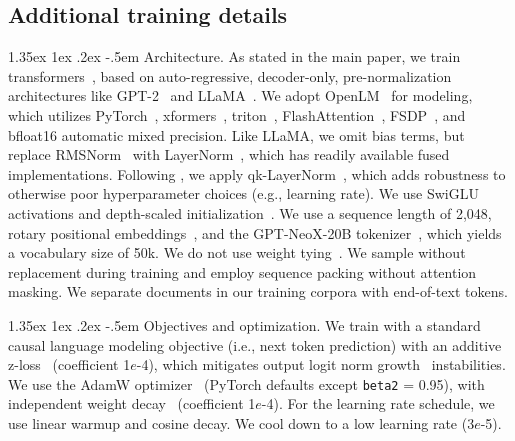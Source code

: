 \documentclass[dvipsnames,11pt]{article}
\makeatletter
\renewcommand\paragraph{\@startsection{paragraph}{4}{\z@}                                     {1.35ex \@plus1ex \@minus.2ex}                                {-.5em}
{\normalfont\normalsize\bfseries}}
\makeatother
\begin{document}
\begin{appendix}
\section{Additional training details}
\label{appx:additional_training_main}

\paragraph{Architecture.}
As stated in the main paper, we train transformers~\cite{transformer}, based on auto-regressive, decoder-only, pre-normalization architectures like GPT-2~\cite{Radford2019LanguageMA} and LLaMA~\cite{llama}.
We adopt OpenLM~\cite{open_lm} for modeling, which utilizes PyTorch~\cite{paszke2019pytorch,pytorch2}, xformers~\cite{xFormers2022}, triton~\cite{triton}, FlashAttention~\cite{dao2022flashattention}, FSDP~\cite{Zhao2023PyTorchFE}, and bfloat16 automatic mixed precision.
Like LLaMA, we omit bias terms, but replace RMSNorm~\cite{Zhang2019RootMS} with LayerNorm~\cite{ba2016layer}, which has readily available fused implementations.
Following \citet{wortsman2023small}, we apply qk-LayerNorm~\cite{dehghani2023scaling}, which adds robustness to otherwise poor hyperparameter choices (e.g., learning rate).
We use SwiGLU~\cite{swiglu} activations and depth-scaled initialization~\cite{zhang-etal-2019-improving}.
We use a sequence length of 2,048, rotary positional embeddings~\cite{rope}, and the GPT-NeoX-20B tokenizer~\cite{neox}, which yields a vocabulary size of 50k.
We do not use weight tying~\cite{press-wolf-2017-using,Inan2016TyingWV}.
We sample without replacement during training and employ sequence packing without attention masking.
We separate documents in our training corpora with end-of-text tokens.

\paragraph{Objectives and optimization.}
We train with a standard causal language modeling objective (i.e., next token prediction) with an additive z-loss~\cite{Chowdhery2022PaLMSL} (coefficient 1$e$-4), which mitigates output logit norm growth~\cite{merrill-etal-2021-effects} instabilities.
We use the AdamW optimizer~\cite{loshchilov2017decoupled} (PyTorch defaults except \texttt{beta2} = 0.95), with independent weight decay~\cite{wortsman2023small} (coefficient 1$e$-4).
For the learning rate schedule, we use linear warmup and cosine decay.
We cool down to a low learning rate (3$e$-5).


\end{appendix}
\end{document}
